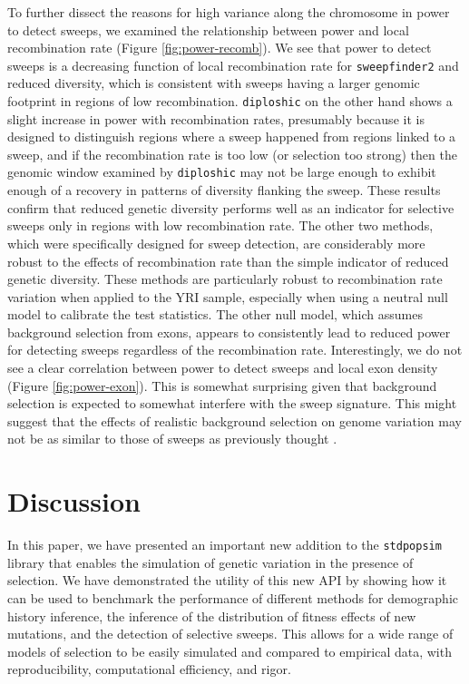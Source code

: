 \documentclass[hidelinks]{article}
\newcommand{\stdpopsim}{\texttt{stdpopsim}\xspace}
\newcommand{\sweepfinder}{\texttt{sweepfinder2}\xspace}
\newcommand{\diploshic}{\texttt{diploshic}\xspace}
\begin{document}
    To further dissect the reasons for high variance along the chromosome in power to detect sweeps,
    we examined the relationship between power and local recombination rate (Figure \ref{fig:power-recomb}).
    We see that power to detect sweeps is
    a decreasing function of local recombination rate for \sweepfinder and reduced diversity,
    which is consistent with sweeps having a larger genomic footprint in regions of low
    recombination.
    \diploshic on the other hand shows a slight increase in power with recombination rates,
    presumably because it is designed to distinguish regions where a sweep happened from regions linked to a sweep,
    and if the recombination rate is too low (or selection too strong) then the genomic window examined by \diploshic may
    not be large enough to exhibit enough of a recovery in patterns of diversity flanking the sweep.
    These results confirm that reduced genetic diversity performs well as an indicator for selective sweeps only in regions with
    low recombination rate.
    The other two methods, which were specifically designed for sweep detection, are considerably more robust
    to the effects of recombination rate than the simple indicator of reduced genetic diversity.
    These methods are particularly robust to recombination rate variation when applied to
    the YRI sample, especially when using a neutral null model to calibrate the test statistics.
    The other null model, which assumes background selection from exons,
    appears to consistently lead to reduced power for detecting sweeps regardless of the recombination rate.
    Interestingly, we do not see a clear correlation between power to detect sweeps and
    local exon density (Figure \ref{fig:power-exon}).
    This is somewhat surprising given that background selection is expected to somewhat interfere with the sweep signature.
    This might suggest that the effects of realistic background selection on genome variation
    may not be as similar to those of sweeps as previously thought \citep{schrider2020background}.

\section*{Discussion}
    \label{Discussion}
    In this paper, we have presented an important new addition to the \stdpopsim{} library
    that enables the simulation of genetic variation in the presence of selection.
    We have demonstrated the utility of this new API by showing how it can be used to benchmark
    the performance of different methods for demographic history inference, the inference of the distribution
    of fitness effects of new mutations, and the detection of selective sweeps.
    This allows for a wide range of models of selection to be easily simulated and compared to
    empirical data, with reproducibility, computational efficiency, and rigor.
\end{document}
